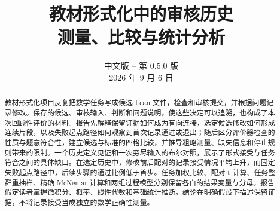 
\title{教材形式化中的审核历史\\[0.6em]\large 测量、比较与统计分析}
\author{}
\date{中文版 -- 第 0.5.0 版\\2026 年 9 月 6 日}

\maketitle
\begin{abstract}
教材形式化项目反复把数学任务写成候选 Lean 文件，检查和审核提交，并根据问题记录修改。保存的候选、审核输入、判断和问题说明，使这些决定可以追溯，也构成了本次回顾性评价的材料。报告先解释保留证据如何成为有向连接，选定候选修改如何形成连续片段，以及失败起点路径如何观察到首次记录通过或退出；随后区分评价器检查的性质与题意符合性，建立候选与标准的四格比较，并推导粗略测量、缺失信息和停止规则带来的限制。一个历史定义见证和一次穷尽输入的布尔对照，展示了形式接受与任务符合之间的具体缺口。在选定历史中，修改前后配对的记录接受情况平均上升，而固定失败起点路径中，后续步骤的通过比例低于首步。任务加权比较、配对 t 计算、任务整群重抽样、精确 McNemar 计算和两组过程模型分别保留各自的结果变量与分母。报告假定读者掌握微积分、概率、线性代数和基础统计推断。结论在明确假设下描述保留证据，不将记录接受当成独立的数学正确性测量。
\end{abstract}
\clearpage
\begingroup
\small
\setlength{\parskip}{0pt}
\renewcommand{\baselinestretch}{1.0}\selectfont
\tableofcontents
\endgroup
\clearpage









\clearpage
\appendix

\clearpage

\begingroup
\small
{}

\endgroup

